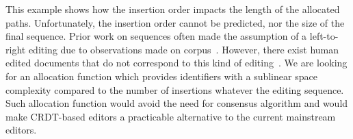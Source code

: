 This example shows how the insertion order impacts the length of the allocated
paths. Unfortunately, the insertion order cannot be predicted, nor the size of
the final sequence. Prior work on sequences often made the assumption of a
left-to-right editing due to observations made on
corpus~\cite{preguica2009commutative, weiss2009logoot}. However, there exist
human edited documents that do not correspond to this kind of
editing~\cite{nedelec2013lseq}.
We are looking for an allocation function which provides identifiers with a
sublinear space complexity compared to the number of insertions whatever the
editing sequence. Such allocation function would avoid the need for consensus
algorithm and would make CRDT-based editors a practicable alternative to the
current mainstream editors.
 
